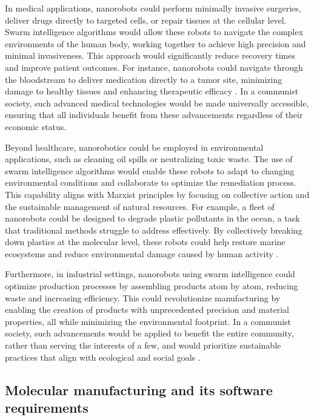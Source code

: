 In medical applications, nanorobots could perform minimally invasive surgeries, deliver drugs directly to targeted cells, or repair tissues at the cellular level. Swarm intelligence algorithms would allow these robots to navigate the complex environments of the human body, working together to achieve high precision and minimal invasiveness. This approach would significantly reduce recovery times and improve patient outcomes. For instance, nanorobots could navigate through the bloodstream to deliver medication directly to a tumor site, minimizing damage to healthy tissues and enhancing therapeutic efficacy \cite[pp.~273-280]{freitas1999nanomedicine}. In a communist society, such advanced medical technologies would be made universally accessible, ensuring that all individuals benefit from these advancements regardless of their economic status.

Beyond healthcare, nanorobotics could be employed in environmental applications, such as cleaning oil spills or neutralizing toxic waste. The use of swarm intelligence algorithms would enable these robots to adapt to changing environmental conditions and collaborate to optimize the remediation process. This capability aligns with Marxist principles by focusing on collective action and the sustainable management of natural resources. For example, a fleet of nanorobots could be designed to degrade plastic pollutants in the ocean, a task that traditional methods struggle to address effectively. By collectively breaking down plastics at the molecular level, these robots could help restore marine ecosystems and reduce environmental damage caused by human activity \cite[pp.~301-308]{ratner2003nanotechnology}.

Furthermore, in industrial settings, nanorobots using swarm intelligence could optimize production processes by assembling products atom by atom, reducing waste and increasing efficiency. This could revolutionize manufacturing by enabling the creation of products with unprecedented precision and material properties, all while minimizing the environmental footprint. In a communist society, such advancements would be applied to benefit the entire community, rather than serving the interests of a few, and would prioritize sustainable practices that align with ecological and social goals \cite[pp.~90-95]{drexler1986engines}.

\subsection{Molecular manufacturing and its software requirements}

